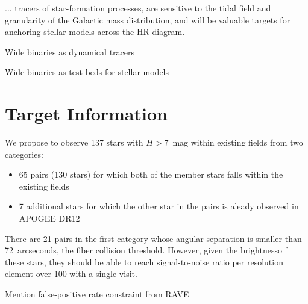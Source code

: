 \documentclass[11pt]{article}
\begin{document}
... tracers of star-formation processes, are
sensitive to the tidal field and granularity of the Galactic mass distribution,
and will be valuable targets for anchoring stellar models across the HR diagram.

Wide binaries as dynamical tracers

Wide binaries as test-beds for stellar models

\section{Target Information}

We propose to observe 137 stars with $H>7$~mag within existing fields
from two categories:
\begin{itemize}
  \item 65 pairs (130 stars) for which both of the member stars falls
  within the existing fields
  \item 7 additional stars for which the other star in the pairs is aleady
  observed in APOGEE DR12
\end{itemize}
%
There are 21 pairs in the first category whose angular separation is smaller
than 72~arcseconds, the fiber collision threshold. However, given the
brightnesso f these stars, they should be able to reach signal-to-noise ratio
per resolution element over 100 with a single visit.

Mention false-positive rate constraint from RAVE



\end{document}
